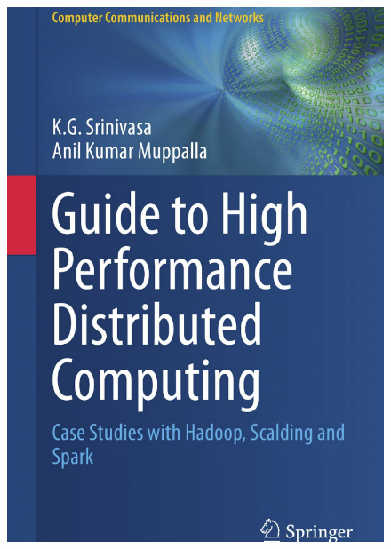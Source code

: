 \begin{frame}
\begin{figure}[ht]
\begin{minipage}[c][1\width]{
				0.4\textwidth}
		\includegraphics[width=\linewidth,height=.7\textheight]{./Figures/chapter-00/high-performance-computing.png}
	\end{minipage}
\end{figure}


\end{frame}

